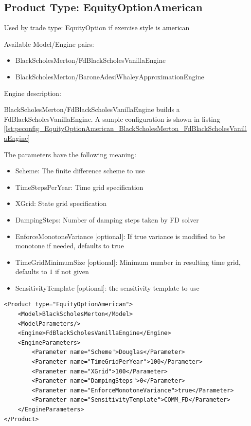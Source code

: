 \subsection{Product Type: EquityOptionAmerican}

Used by trade type: EquityOption if exercise style is american

Available Model/Engine pairs:

\begin{itemize}
\item BlackScholesMerton/FdBlackScholesVanillaEngine
\item BlackScholesMerton/BaroneAdesiWhaleyApproximationEngine
\end{itemize}

Engine description:

BlackScholesMerton/FdBlackScholesVanillaEngine builds a FdBlackScholesVanillaEngine. A sample configuration is shown in listing
\ref{lst:peconfig_EquityOptionAmerican_BlackScholesMerton_FdBlackScholesVanillaEngine}

The parameters have the following meaning:

\begin{itemize}
\item Scheme: The finite difference scheme to use
\item TimeStepsPerYear: Time grid specification
\item XGrid: State grid specification
\item DampingSteps: Number of damping steps taken by FD solver
\item EnforceMonotoneVariance [optional]: If true variance is modified to be monotone if needed, defaults to true
\item TimeGridMinimumSize [optional]: Minimum number in resulting time grid, defaults to $1$ if not given
\item SensitivityTemplate [optional]: the sensitivity template to use
\end{itemize}

\begin{longlisting}
\begin{verbatim}
<Product type="EquityOptionAmerican">
    <Model>BlackScholesMerton</Model>
    <ModelParameters/>
    <Engine>FdBlackScholesVanillaEngine</Engine>
    <EngineParameters>
        <Parameter name="Scheme">Douglas</Parameter>
        <Parameter name="TimeGridPerYear">100</Parameter>
        <Parameter name="XGrid">100</Parameter>
        <Parameter name="DampingSteps">0</Parameter>
        <Parameter name="EnforceMonotoneVariance">true</Parameter>
        <Parameter name="SensitivityTemplate">COMM_FD</Parameter>
    </EngineParameters>
</Product>
\end{verbatim}
\caption{Configuration for Product EquityOptionAmerican, Model BlackScholesMerton, Engine FdBlackScholesVanillaEngine}
\label{lst:peconfig_EquityOptionAmerican_BlackScholesMerton_FdBlackScholesVanillaEngine}
\end{longlisting}

